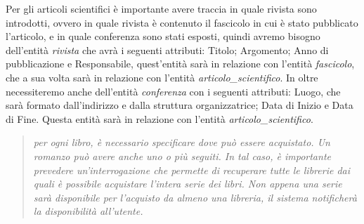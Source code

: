 \documentclass{article}
\begin{document}
 Per gli articoli scientifici è importante avere traccia in quale rivista sono introdotti, ovvero in quale rivista è contenuto il fascicolo in cui è stato pubblicato l'articolo, e in quale conferenza sono stati esposti, quindi avremo bisogno dell'entità \textit{rivista} che avrà i seguenti attributi: Titolo; Argomento; Anno di pubblicazione e Responsabile, quest'entità sarà in relazione con l'entità \textit{fascicolo}, che a sua volta sarà in relazione con l'entità \textit{articolo\_scientifico}. In oltre necessiteremo anche dell'entità \textit{conferenza} con i seguenti attributi: Luogo, che sarà formato dall'indirizzo e dalla struttura organizzatrice; Data di Inizio e Data di Fine. Questa entità sarà in relazione con l'entità \textit{articolo\_scientifico}. 

\begin{quote}
\textit{per ogni libro, è necessario specificare dove può essere acquistato. Un romanzo può avere anche uno o più seguiti. In tal caso, è importante prevedere un’interrogazione che permette di recuperare tutte le librerie dai quali è possibile acquistare l’intera serie dei libri. Non appena una serie sarà disponibile per l’acquisto da almeno una libreria, il sistema notificherà la disponibilità all’utente.}
\end{quote}
\end{document}
